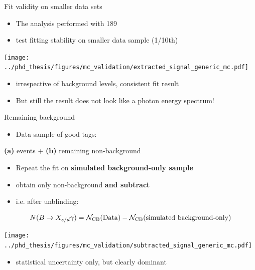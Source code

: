 \documentclass[xcolor=dvipsnames]{beamer}
\begin{document}
\begin{frame}{Fit validity on smaller data sets}
   \scriptsize\centering
   \begin{itemize}
      \item The analysis performed with 189~\invfb
      \item[\ra] test fitting stability on smaller data sample (1/10th)
   \end{itemize}

      \texttt{[image: ../phd\_thesis/figures/mc\_validation/extracted\_signal\_generic\_mc.pdf]}
  \begin{itemize}
   \item[\ra] irrespective of background levels, consistent fit result
   \item[\ra] But still the result does not look like a photon energy spectrum!   
  \end{itemize}
\end{frame}

\begin{frame}{Remaining background}
\scriptsize\centering
   \begin{itemize}
      \item Data sample of {\color{ForestGreen} good tags}:
   \end{itemize}
       \textbf{(a)} \BtoXsgamma events + \textbf{(b)} remaining non-\BtoXsgamma background
   
       \vspace{10pt}
       \begin{itemize}
      \item Repeat the fit on \textbf{simulated background-only sample}
      \item[\ra] obtain only non-\BtoXsgamma background \textbf{and subtract}
      \item i.e. after unblinding:
   \end{itemize}
   \begin{equation*}
      N(\BtoXsdgamma) = \mathcal{N}_{\mathrm{CB}}(\text{Data}) - \mathcal{N}_{\mathrm{CB}}(\text{simulated background-only}) 
   \end{equation*}



   \texttt{[image: ../phd\_thesis/figures/mc\_validation/subtracted\_signal\_generic\_mc.pdf]}

\begin{itemize}
   \item[\ra] statistical uncertainty only, but clearly dominant 
\end{itemize}

\end{frame}
\end{document}
